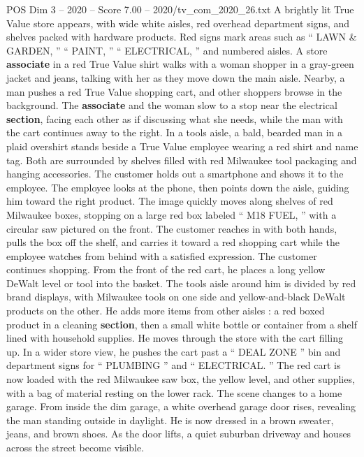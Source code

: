 \begin{textsample}{POS Dim 3 – 2020 – Score 7.00 – 2020/tv\_com\_2020\_26.txt}  \label{ex:f3_pos_072}
A brightly lit True Value store appears, with wide white aisles, red overhead department signs, and shelves packed with hardware products.
Red signs mark areas such as “ LAWN \& GARDEN, ” “ PAINT, ” “ ELECTRICAL, ” and numbered aisles.
A store \textbf{associate} in a red True Value shirt walks with a woman shopper in a gray-green jacket and jeans, talking with her as they move down the main aisle.
Nearby, a man pushes a red True Value shopping cart, and other shoppers browse in the background.
The \textbf{associate} and the woman slow to a stop near the electrical \textbf{section}, facing each other as if discussing what she needs, while the man with the cart continues away to the right.
In a tools aisle, a bald, bearded man in a plaid overshirt stands beside a True Value employee wearing a red shirt and name tag.
Both are surrounded by shelves filled with red Milwaukee tool packaging and hanging accessories.
The customer holds out a smartphone and shows it to the employee.
The employee looks at the phone, then points down the aisle, guiding him toward the right product.
The image quickly moves along shelves of red Milwaukee boxes, stopping on a large red box labeled “ M18 FUEL, ” with a circular saw pictured on the front.
The customer reaches in with both hands, pulls the box off the shelf, and carries it toward a red shopping cart while the employee watches from behind with a satisfied expression.
The customer continues shopping.
From the front of the red cart, he places a long yellow DeWalt level or tool into the basket.
The tools aisle around him is divided by red brand displays, with Milwaukee tools on one side and yellow-and-black DeWalt products on the other.
He adds more items from other aisles : a red boxed product in a cleaning \textbf{section}, then a small white bottle or container from a shelf lined with household supplies.
He moves through the store with the cart filling up.
In a wider store view, he pushes the cart past a “ DEAL ZONE ” bin and department signs for “ PLUMBING ” and “ ELECTRICAL. ” The red cart is now loaded with the red Milwaukee saw box, the yellow level, and other supplies, with a bag of material resting on the lower rack.
The scene changes to a home garage.
From inside the dim garage, a white overhead garage door rises, revealing the man standing outside in daylight.
He is now dressed in a brown sweater, jeans, and brown shoes.
As the door lifts, a quiet suburban driveway and houses across the street become visible.

\end{textsample}
